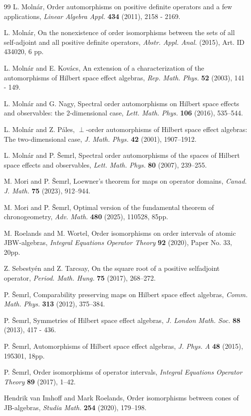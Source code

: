 \documentclass{article}
\begin{document}
\begin{thebibliography}{99}
L. Moln\' ar, Order automorphisms on positive definite operators and a few applications,
{\em Linear Algebra Appl.} {\bf 434} (2011), 2158 - 2169.

L. Moln\' ar, On the nonexistence of order isomorphisms between the sets of all self-adjoint and all positive definite operators, 
{\em Abstr. Appl. Anal.} (2015), Art. ID 434020, 6 pp. 

L. Moln\' ar and E. Kov\' acs, An extension of a characterization of the automorphisms
of Hilbert space effect algebras, {\em Rep. Math. Phys.} {\bf 52} (2003), 141 - 149.

L. Moln\' ar and G. Nagy, Spectral order automorphisms on Hilbert space effects and observables: the 2-dimensional case, {\em Lett. Math. Phys.} {\bf 106} (2016), 535--544.



L. Moln\' ar and Z. P\' ales, $\perp$-order automorphisms of Hilbert space effect algebras:
The two-dimensional case, {\em J. Math. Phys.} {\bf 42} (2001), 1907--1912.

L. Moln\' ar and P. \v Semrl, Spectral order automorphisms of the spaces of Hilbert space effects and
observables, {\em Lett. Math. Phys.} {\bf 80} (2007), 239--255.

M. Mori and P. \v Semrl, Loewner's theorem for maps on operator domains, {\em Canad. J. Math.} {\bf 75}  (2023), 912--944.

M. Mori and P. \v Semrl, Optimal version of the fundamental theorem of chronogeometry, {\em Adv. Math.} {\bf 480} (2025), 110528, 85pp.

M. Roelands and M. Wortel, Order isomorphisms on order intervals of atomic JBW-algebras, {\em Integral Equations Operator Theory} {\bf 92} (2020), Paper No. 33, 20pp.

Z. Sebesty\' en and Z. Tarcsay, On the square root of a positive selfadjoint operator,
{\em Period. Math. Hung.} {\bf 75}  (2017), 268--272. 

P. \v Semrl, Comparability preserving maps on Hilbert space effect algebras, {\em Comm. Math. Phys.} {\bf 313} (2012), 375--384.


P. \v Semrl, Symmetries of Hilbert space effect algebras, {\em J. London Math. Soc.}
{\bf  88}  (2013), 417 - 436.

P. \v Semrl,  Automorphisms of Hilbert space effect algebras,
{\em J. Phys.  A}
{\bf 48}
(2015), 195301,
18pp.

P. \v Semrl, Order isomorphisms of operator intervals,  {\em Integral Equations Operator Theory} {\bf 89} (2017), 1--42.

Hendrik van Imhoff and Mark Roelands, Order isomorphisms between cones of JB-algebras, {\em Studia Math.} {\bf 254} (2020), 179--198.
\end{thebibliography}
\end{document}
